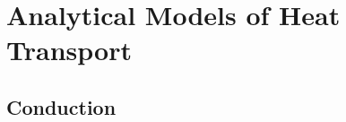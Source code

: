 











\section{Analytical Models of Heat Transport} \label{sec:analytical_heat}

\subsection{Conduction}

